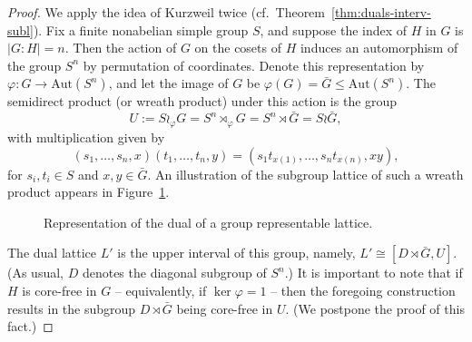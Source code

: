 \documentclass[cm,dissertation,actual,final]{uhthesis}
\theoremstyle{plain}
\theoremstyle{definition}
\theoremstyle{remark}
\numberwithin{theorem}{section}
\numberwithin{claim}{chapter}
\numberwithin{equation}{section}
\numberwithin{conjecture}{chapter}
\newcommand{\<}{\ensuremath{\langle}}
\renewcommand{\>}{\ensuremath{\rangle}}
\renewcommand{\leq}{\ensuremath{\leqslant}}
\newcommand{\Aut}{\ensuremath{\mathrm{Aut}}}
\newcommand{\Eq}{\ensuremath{\mathrm{Eq}}}
\newcommand{\0}{\ensuremath{\mathbf{0}}}
\newcommand{\1}{\ensuremath{\mathbf{1}}}
\newcommand{\2}{\ensuremath{\mathbf{2}}}
\newcommand{\3}{\ensuremath{\mathbf{3}}}
\newcommand{\4}{\ensuremath{\mathbf{4}}}
\newcommand{\5}{\ensuremath{\mathbf{5}}}
\renewcommand{\phi}{\ensuremath{\varphi}}
\begin{document}
\begin{proof}
  We apply the idea of Kurzweil twice
  (cf.~Theorem~\ref{thm:duals-interv-subl}).  Fix a finite nonabelian simple
  group $S$, and suppose the index of $H$ in $G$ is $|G:H| = n$.
  Then the action of $G$ on the cosets of $H$ induces an automorphism of the
  group $S^n$ by permutation of coordinates.  Denote this representation by
  $\phi: G \rightarrow \Aut(S^n)$, 
  and let the image of $G$ be $\phi(G) =
  \bar{G} \leq \Aut(S^n)$.  
%
  The semidirect product (or wreath product) under this action is the group
  \[
  U:= S\wr_\phi G = S^n \rtimes_\phi G = S^n \rtimes \bar{G} =  S\wr \bar{G},
  \]
  with multiplication given by
  \[
  (s_1, \dots, s_n, x) (t_1, \dots, t_n, y) = 
  (s_1 t_{x(1)}, \dots, s_nt_{x(n)}, x y),
  \]
  for $s_i, t_i \in S$ and $x, y \in \bar{G}$.
  An illustration of the subgroup lattice of such a wreath product appears in Figure~\ref{fig:kurzweil}.
  \begin{figure}[!h]
\begin{center}
\end{center}
    \caption{Representation of the dual of a group representable lattice.}
    \label{fig:kurzweil}
  \end{figure}
  The dual lattice $L'$ is the upper interval of this group, namely,
  $L'\cong [D\rtimes \bar{G}, U]$.
  (As usual, $D$ denotes the diagonal subgroup of $S^n$.)  It is important to
  note that if $H$ is core-free in $G$ -- equivalently, if $\ker \phi = 1$
  -- then the foregoing construction results in the subgroup $D\rtimes \bar{G}$ being
  core-free in $U$.   (We postpone the proof of this fact.)


\end{proof}
\end{document}
